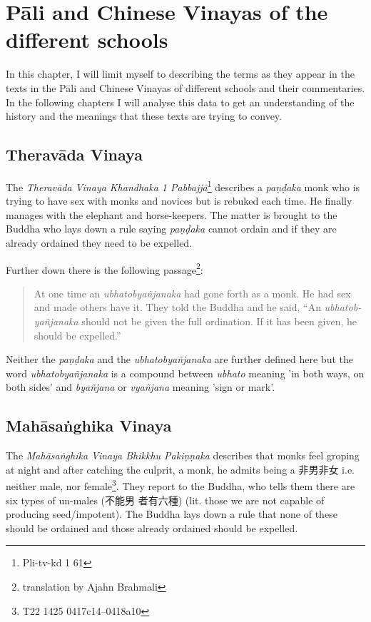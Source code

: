\section{Pāli and Chinese Vinayas of the different schools}

In this chapter, I will limit myself to describing the terms as they appear in the texts in the Pāli and Chinese Vinayas of different schools and their commentaries. In the following chapters I will analyse this data to get an understanding of the history and the meanings that these texts are trying to convey.

\subsection{Theravāda Vinaya}
The {\em Theravāda Vinaya Khandhaka 1 Pabbajjā}\footnote{Pli-tv-kd 1 61} describes a {\em paṇḍaka} monk who is trying to have sex with monks and novices but is rebuked each time. He finally manages with the elephant and horse-keepers. The matter is brought to the Buddha who lays down a rule saying {\em paṇḍaka} cannot ordain and if they are already ordained they need to be expelled.

Further down there is the following passage\footnote{translation by Ajahn Brahmali}:

\begin{quote}
At one time an {\em ubhatob­yañ­janaka} had gone forth as a monk. He had sex and made others have it. They told the Buddha and he said, “An {\em ubhatob­yañ­janaka} should not be given the full ordination. If it has been given, he should be expelled.”
\end{quote}

Neither the {\em paṇḍaka} and the {\em ubhatob­yañ­janaka} are further defined here but the word {\em ubhatob­yañ­janaka} is a compound between {\em ubhato} meaning 'in both ways, on both sides' and {\em byañjana} or {\em vyañjana} meaning 'sign or mark'.


\subsection{Mahāsaṅghika Vinaya}
The {\em Mahāsaṅghika Vinaya Bhikkhu Pakiṇṇaka} describes that monks feel groping at night and after catching the culprit, a monk, he admits being a 非男非女 i.e. neither male, nor female\footnote{T22 1425 0417c14–0418a10}. They report to the Buddha, who tells them there are six types of un-males (不能男 者有六種) (lit. those we are not capable of producing seed/impotent). The Buddha lays down a rule that none of these should be ordained and those already ordained should be expelled.

